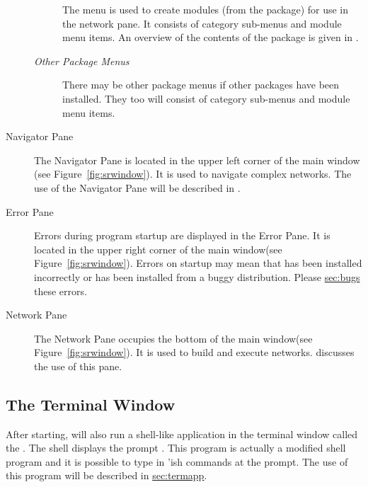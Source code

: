 \begin{description}
  \begin{description}
  \item[] The  menu is used to create modules
    (from the \pse package) for use in the network pane.  It consists
    of category sub-menus and module menu items.   An overview of the
    contents of the \sr{} package is given in .
  \end{description}

  \begin{description}
  \item [\textit{Other Package Menus}] There may be other package
    menus if other packages have been installed.  They too will consist
    of category sub-menus and module menu items.
  \end{description}
  
\item[Navigator Pane] The Navigator Pane is located in the upper left
  corner of the main window (see Figure~\ref{fig:srwindow}). It is used to
  navigate complex networks.  The use of the Navigator Pane will be
  described in .
  
\item[Error Pane] Errors during program startup are displayed in the Error
  Pane.  It is located in the upper right corner of the main window(see
  Figure~\ref{fig:srwindow}).  Errors on startup may mean that \sr{} has
  been installed incorrectly or has been installed from a buggy
  distribution.  Please \hyperref{report}{(see Section~}{)}{sec:bugs} these
  errors.
  
\item[Network Pane] The Network Pane occupies the bottom of the main
  window(see Figure~\ref{fig:srwindow}).  It is used to build and execute
  networks.   discusses the use
  of this pane.

\end{description}

\subsection{The Terminal Window}
\label{sec:termwinapp}

After starting, \sr{} will also run a shell-like application in the
terminal window called the .  The \sr{} shell displays the
prompt .  This program is actually a modified  shell program and it is possible to type in
'ish \sr{} commands at the prompt. The use of this program
will be described in \hyperref{a later section}{Section~}{}{sec:termapp}.


